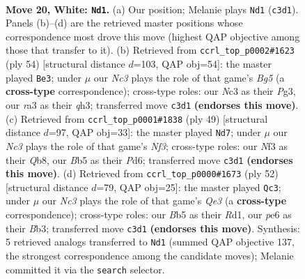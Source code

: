 \documentclass[11pt]{article}
\begin{document}
\clearpage

\begin{figure}[p]\centering
\begin{subfigure}{0.46\textwidth}\centering
\resizebox{\linewidth}{!}{%
\newchessgame
\chessboard[
  setfen={1nb2r1k/2q2p2/1p2p1p1/1B5p/3PQ3/r1N2NP1/P1P2PP1/2R2K2 w - - 1 20},
  showmover=false,
  pgfstyle=straightmove, color=movearrow, markmove={c3-d1}
]}
\caption{}
\end{subfigure}\hfill
\begin{subfigure}{0.46\textwidth}\centering
\resizebox{\linewidth}{!}{%
\newchessgame
\chessboard[
  setfen={1r4k1/p2r1pbn/2p3p1/2P1p1Bp/RP2P3/5QPq/3N1P1P/4R1K1 w - - 1 28},
  showmover=false,
  pgfstyle=straightmove, color=movearrow, markmove={g5-e3}
]}
\caption{}
\end{subfigure}
\\[4pt]
\begin{subfigure}{0.46\textwidth}\centering
\resizebox{\linewidth}{!}{%
\newchessgame
\chessboard[
  setfen={1q1r2k1/p4p2/2ppbnp1/7p/N7/PPQ2PP1/2P1B2P/2K1R3 b - - 1 25},
  showmover=false,
  pgfstyle=straightmove, color=movearrow, markmove={f6-d7}
]}
\caption{}
\end{subfigure}\hfill
\begin{subfigure}{0.46\textwidth}\centering
\resizebox{\linewidth}{!}{%
\newchessgame
\chessboard[
  setfen={4rb1k/2pq1pp1/2n3bp/1p6/3P3P/1B2QNN1/1P3PP1/3R2K1 w - - 1 27},
  showmover=false,
  pgfstyle=straightmove, color=movearrow, markmove={e3-c3}
]}
\caption{}
\end{subfigure}
\caption{\textbf{Move 20, White: \texttt{Nd1}.} (a) Our position; Melanie plays \texttt{Nd1} (\texttt{c3d1}). Panels (b)--(d) are the retrieved master positions whose correspondence most drove this move (highest QAP objective among those that transfer to it). (b) Retrieved from \texttt{ccrl\_top\_p0002\#1623} (ply 54) [structural distance $d$=103, QAP obj=54]: the master played \texttt{Be3}; under $\mu$ our \emph{Nc3} plays the role of that game's \emph{Bg5} (a \textbf{cross-type} correspondence); cross-type roles: our \emph{N}c3 as their \emph{P}g3, our \emph{r}a3 as their \emph{q}h3; transferred move \texttt{c3d1} \textbf{(endorses this move)}. (c) Retrieved from \texttt{ccrl\_top\_p0001\#1838} (ply 49) [structural distance $d$=97, QAP obj=33]: the master played \texttt{Nd7}; under $\mu$ our \emph{Nc3} plays the role of that game's \emph{Nf3}; cross-type roles: our \emph{N}f3 as their \emph{Q}b8, our \emph{B}b5 as their \emph{P}d6; transferred move \texttt{c3d1} \textbf{(endorses this move)}. (d) Retrieved from \texttt{ccrl\_top\_p0000\#1673} (ply 52) [structural distance $d$=79, QAP obj=25]: the master played \texttt{Qc3}; under $\mu$ our \emph{Nc3} plays the role of that game's \emph{Qe3} (a \textbf{cross-type} correspondence); cross-type roles: our \emph{B}b5 as their \emph{R}d1, our \emph{p}e6 as their \emph{B}b3; transferred move \texttt{c3d1} \textbf{(endorses this move)}. Synthesis: 5 retrieved analogs transferred to \texttt{Nd1} (summed QAP objective 137, the strongest correspondence among the candidate moves); Melanie committed it via the \texttt{search} selector.}
\label{fig:thought-m38}
\end{figure}
\end{document}
